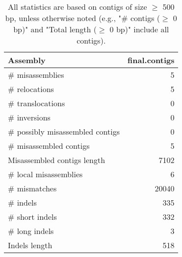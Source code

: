 \documentclass[12pt,a4paper]{article}
\begin{document}
\begin{table}[ht]
\begin{center}
\caption{All statistics are based on contigs of size $\geq$ 500 bp, unless otherwise noted (e.g., "\# contigs ($\geq$ 0 bp)" and "Total length ($\geq$ 0 bp)" include all contigs).}
\begin{tabular}{|l*{1}{|r}|}
\hline
Assembly & final.contigs \\ \hline
\# misassemblies & 5 \\ \hline
\hspace{5mm}\# relocations & 5 \\ \hline
\hspace{5mm}\# translocations & 0 \\ \hline
\hspace{5mm}\# inversions & 0 \\ \hline
\# possibly misassembled contigs & 0 \\ \hline
\# misassembled contigs & 5 \\ \hline
Misassembled contigs length & 7102 \\ \hline
\# local misassemblies & 6 \\ \hline
\# mismatches & 20040 \\ \hline
\# indels & 335 \\ \hline
\hspace{5mm}\# short indels & 332 \\ \hline
\hspace{5mm}\# long indels & 3 \\ \hline
Indels length & 518 \\ \hline
\end{tabular}
\end{center}
\end{table}
\end{document}
